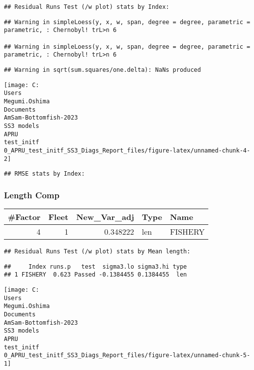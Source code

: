 \documentclass[
]{article}
\begin{document}
\begin{verbatim}
## Residual Runs Test (/w plot) stats by Index:
\end{verbatim}

\begin{verbatim}
## Warning in simpleLoess(y, x, w, span, degree = degree, parametric = parametric, : Chernobyl! trL>n 6

## Warning in simpleLoess(y, x, w, span, degree = degree, parametric = parametric, : Chernobyl! trL>n 6
\end{verbatim}

\begin{verbatim}
## Warning in sqrt(sum.squares/one.delta): NaNs produced
\end{verbatim}

\begin{center}\texttt{[image: C:\\Users\\Megumi.Oshima\\Documents\\AmSam-Bottomfish-2023\\SS3 models\\APRU\\test\_initf\\0\_APRU\_test\_initf\_SS3\_Diags\_Report\_files/figure-latex/unnamed-chunk-4-2]} \end{center}

\begin{verbatim}
## RMSE stats by Index:
\end{verbatim}

\hypertarget{length-comp}{%
\subsubsection{Length Comp}\label{length-comp}}

\captionsetup[table]{labelformat=empty,skip=1pt}
\begin{longtable}{rrrll}
\toprule
\#Factor & Fleet & New\_Var\_adj & Type & Name \\ 
\midrule
4 & 1 & 0.348222 & len & FISHERY \\ 
\bottomrule
\end{longtable}

\begin{verbatim}
## Residual Runs Test (/w plot) stats by Mean length:
\end{verbatim}

\begin{verbatim}
##     Index runs.p   test  sigma3.lo sigma3.hi type
## 1 FISHERY  0.623 Passed -0.1384455 0.1384455  len
\end{verbatim}

\begin{center}\texttt{[image: C:\\Users\\Megumi.Oshima\\Documents\\AmSam-Bottomfish-2023\\SS3 models\\APRU\\test\_initf\\0\_APRU\_test\_initf\_SS3\_Diags\_Report\_files/figure-latex/unnamed-chunk-5-1]} \end{center}
\end{document}
